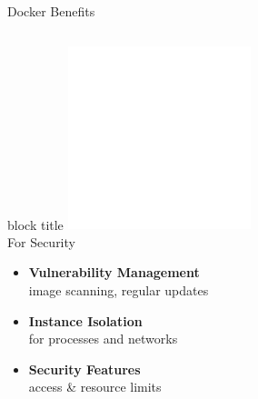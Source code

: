 \documentclass[notes]{beamer}
\begin{document}
{\begin{frame}{Docker Benefits}
\begin{columns}[T]
    \begin{column}{0.32\textwidth}
\begin{beamercolorbox}[shadow=true,rounded=true]{block title}
        \centering 
        \includegraphics[width=0.4\textwidth]{security.png}\\[0.3em]
        For Security
      \end{beamercolorbox}
      \begin{itemize}
        \item \textbf{Vulnerability Management} \\[-0.4em]
        {\tiny image scanning, regular updates}
        \item \textbf{Instance Isolation} \\[-0.4em]
        {\tiny for processes and networks}
        \item \textbf{Security Features} \\[-0.4em]
        {\tiny access \& resource limits}
      \end{itemize}
    \end{column}
  \end{columns}
\end{frame}
}

{



}
\end{document}
